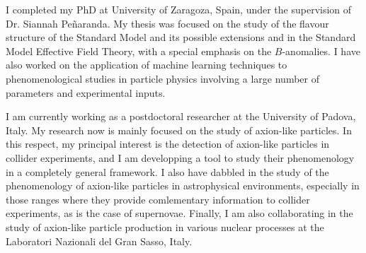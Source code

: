 \documentclass[combined.tex]{subfiles}
\begin{document}
I completed my PhD at University of Zaragoza, Spain, under the supervision of Dr. Siannah Pe\~naranda. My thesis was focused on the study of the flavour structure of the Standard Model and its possible extensions and in the Standard Model Effective Field Theory, with a special emphasis on the $B$-anomalies. I have also worked on the application of machine learning techniques to phenomenological studies in particle physics involving a large number of parameters and experimental inputs.

I am currently working as a postdoctoral researcher at the University of Padova, Italy. My research now is mainly focused on the study of axion-like particles.
In this respect, my principal interest is the detection of axion-like particles in collider experiments, and I am developping a tool to study their phenomenology in a completely general framework. I also have dabbled in the study of the phenomenology of axion-like particles in astrophysical environments, especially in those ranges where they provide comlementary information to collider experiments, as is the case of supernovae. Finally, I am also collaborating in the study of axion-like particle production in various nuclear processes at the Laboratori Nazionali del Gran Sasso, Italy.

{}~
\end{document}
